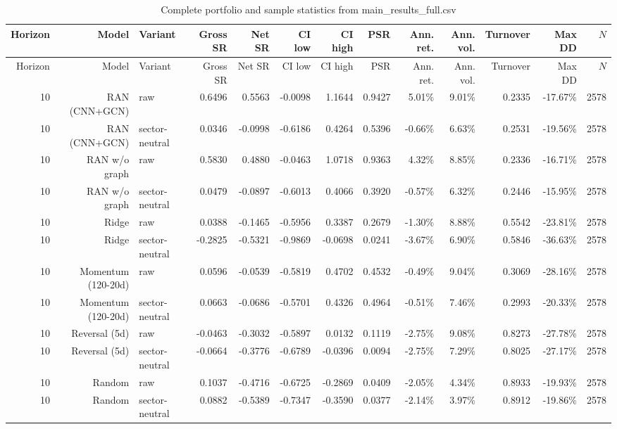 \documentclass[10pt]{article}
\begin{document}
\begingroup\scriptsize\setlength{\tabcolsep}{2.5pt}
\begin{longtable}{rrlrrrrrrrrrr}
\caption{Complete portfolio and sample statistics from main\_results\_full.csv}\label{tab:fullresults_port}\\
\toprule
Horizon & Model & Variant & Gross SR & Net SR & CI low & CI high & PSR & Ann. ret. & Ann. vol. & Turnover & Max DD & $N$ \\
\midrule
\endfirsthead
\toprule
Horizon & Model & Variant & Gross SR & Net SR & CI low & CI high & PSR & Ann. ret. & Ann. vol. & Turnover & Max DD & $N$ \\
\midrule
\endhead
10 & RAN (CNN+GCN) & raw & 0.6496 & 0.5563 & -0.0098 & 1.1644 & 0.9427 & 5.01\% & 9.01\% & 0.2335 & -17.67\% & 2578 \\
10 & RAN (CNN+GCN) & sector-neutral & 0.0346 & -0.0998 & -0.6186 & 0.4264 & 0.5396 & -0.66\% & 6.63\% & 0.2531 & -19.56\% & 2578 \\
10 & RAN w/o graph & raw & 0.5830 & 0.4880 & -0.0463 & 1.0718 & 0.9363 & 4.32\% & 8.85\% & 0.2336 & -16.71\% & 2578 \\
10 & RAN w/o graph & sector-neutral & 0.0479 & -0.0897 & -0.6013 & 0.4066 & 0.3920 & -0.57\% & 6.32\% & 0.2446 & -15.95\% & 2578 \\
10 & Ridge & raw & 0.0388 & -0.1465 & -0.5956 & 0.3387 & 0.2679 & -1.30\% & 8.88\% & 0.5542 & -23.81\% & 2578 \\
10 & Ridge & sector-neutral & -0.2825 & -0.5321 & -0.9869 & -0.0698 & 0.0241 & -3.67\% & 6.90\% & 0.5846 & -36.63\% & 2578 \\
10 & Momentum (120-20d) & raw & 0.0596 & -0.0539 & -0.5819 & 0.4702 & 0.4532 & -0.49\% & 9.04\% & 0.3069 & -28.16\% & 2578 \\
10 & Momentum (120-20d) & sector-neutral & 0.0663 & -0.0686 & -0.5701 & 0.4326 & 0.4964 & -0.51\% & 7.46\% & 0.2993 & -20.33\% & 2578 \\
10 & Reversal (5d) & raw & -0.0463 & -0.3032 & -0.5897 & 0.0132 & 0.1119 & -2.75\% & 9.08\% & 0.8273 & -27.78\% & 2578 \\
10 & Reversal (5d) & sector-neutral & -0.0664 & -0.3776 & -0.6789 & -0.0396 & 0.0094 & -2.75\% & 7.29\% & 0.8025 & -27.17\% & 2578 \\
10 & Random & raw & 0.1037 & -0.4716 & -0.6725 & -0.2869 & 0.0409 & -2.05\% & 4.34\% & 0.8933 & -19.93\% & 2578 \\
10 & Random & sector-neutral & 0.0882 & -0.5389 & -0.7347 & -0.3590 & 0.0377 & -2.14\% & 3.97\% & 0.8912 & -19.86\% & 2578 \\

\end{longtable}
\end{document}

